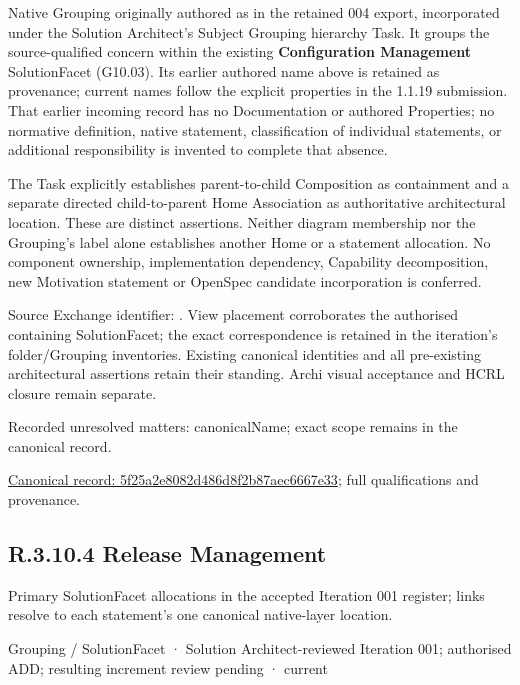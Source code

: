 Native Grouping originally authored as \texttt{} in the retained 004 export,
incorporated under the Solution Architect's Subject Grouping hierarchy Task.
It groups the source-qualified \texttt{} concern within
the existing \textbf{Configuration Management} SolutionFacet (G10.03). Its earlier authored name above is retained as provenance; current names
follow the explicit properties in the 1.1.19 submission.
That earlier incoming record has no Documentation or authored Properties; no normative
definition, native statement, classification of individual statements, or
additional responsibility is invented to complete that absence.



The Task explicitly establishes parent-to-child Composition as containment and
a separate directed child-to-parent Home Association as authoritative architectural
location. These are distinct assertions. Neither diagram membership nor the
Grouping's label alone establishes another Home or a statement allocation.
No component ownership, implementation dependency, Capability decomposition,
new Motivation statement or OpenSpec candidate incorporation is conferred.



Source Exchange identifier: \texttt{}. View placement corroborates
the authorised containing SolutionFacet; the exact correspondence is retained in the
iteration's folder/Grouping inventories. Existing canonical identities and all
pre-existing architectural assertions retain their standing. Archi visual
acceptance and HCRL closure remain separate.


{\small Recorded unresolved matters: canonicalName; exact scope remains in the canonical record.}\par
{\footnotesize \href{../../../../../../../continuum/grouping/5f25a2e8082d486d8f2b87aec6667e33.md}{Canonical record: 5f25a2e8082d486d8f2b87aec6667e33}; full qualifications and provenance.}\par
\subsection*{R.3.10.4 Release Management}
\label{navigation:R.3.10.4}

Primary SolutionFacet allocations in the accepted Iteration 001 register; links resolve to each statement’s one canonical native-layer location.\par
\label{element:6b4df7dee51344b3b8c4c6eaace50d72}
{\small Grouping / SolutionFacet · Solution Architect-reviewed Iteration 001; authorised ADD; resulting increment review pending · current}\par

